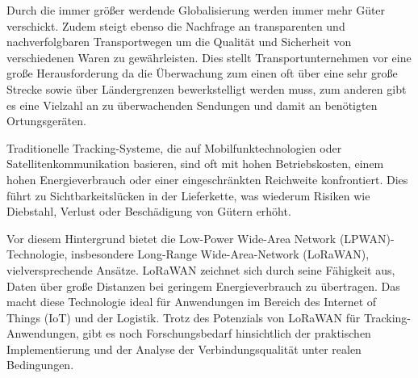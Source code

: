\label{sec:motivation_problemstellung}
Durch die immer größer werdende Globalisierung werden immer mehr Güter verschickt. Zudem steigt ebenso die Nachfrage an transparenten und nachverfolgbaren Transportwegen um die Qualität und Sicherheit von verschiedenen Waren zu gewährleisten. Dies stellt Transportunternehmen vor eine große Herausforderung da die Überwachung zum einen oft über eine sehr große Strecke sowie über Ländergrenzen bewerkstelligt werden muss, zum anderen gibt es eine Vielzahl an zu überwachenden Sendungen und damit an benötigten Ortungsgeräten.

Traditionelle Tracking-Systeme, die auf Mobilfunktechnologien oder Satellitenkommunikation basieren, sind oft mit hohen Betriebskosten, einem hohen Energieverbrauch oder einer eingeschränkten Reichweite konfrontiert. Dies führt zu Sichtbarkeitslücken in der Lieferkette, was wiederum Risiken wie Diebstahl, Verlust oder Beschädigung von Gütern erhöht.

Vor diesem Hintergrund bietet die Low-Power Wide-Area Network (LPWAN)-Technologie, insbesondere Long-Range Wide-Area-Network (LoRaWAN), vielversprechende Ansätze. LoRaWAN zeichnet sich durch seine Fähigkeit aus, Daten über große Distanzen bei geringem Energieverbrauch zu übertragen. Das macht diese Technologie ideal für Anwendungen im Bereich des Internet of Things (IoT) und der Logistik. Trotz des Potenzials von LoRaWAN für Tracking-Anwendungen, gibt es noch Forschungsbedarf hinsichtlich der praktischen Implementierung und der Analyse der Verbindungsqualität unter realen Bedingungen.